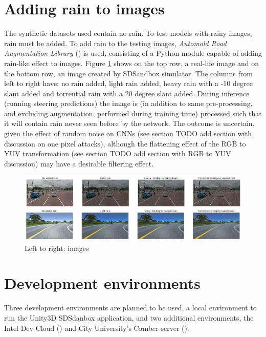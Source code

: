 \section{Adding rain to images}
The synthetic datasets used contain no rain. To test models with rainy images, rain must be added. 
To add rain to the testing images, \textit{Automold Road Augmentation Library} (\cite{Saxena2017}) is used, consisting of a Python module capable of adding rain-like effect to images. Figure \ref{fig:AutomoldRoadAugmentationLibrary} shows on the top row, a real-life image and on the bottom row, an image created by SDSandbox simulator. The columns from left to right have: no rain added, light rain added, heavy rain with a -10 degree slant added and torrential rain with a 20 degree slant added.  
During inference (running steering predictions) the image is (in addition to same pre-processing, and excluding augmentation, performed during training time) processed such that it will contain rain never seen before by the network. The outcome is uncertain, given the effect of random noise on CNNs (see section TODO add section with discussion on one pixel attacks), although the flattening effect of the RGB to YUV transformation (see section TODO add section with RGB to YUV discussion) may have a desirable filtering effect.

\begin{figure}[h!]
\centering
\includegraphics[width=\textwidth]{Figures/AutomoldRain.png}
\caption{Left to right: images}
\label{fig:AutomoldRoadAugmentationLibrary}
\end{figure}

\section{Development environments}

Three development environments are planned to be used, a local environment to run the Unity3D SDSdanbox application, and two additional environments, the Intel Dev-Cloud (\cite{IntelDevCloud2020}) and City University's Camber server (\cite{Camber2019}).

